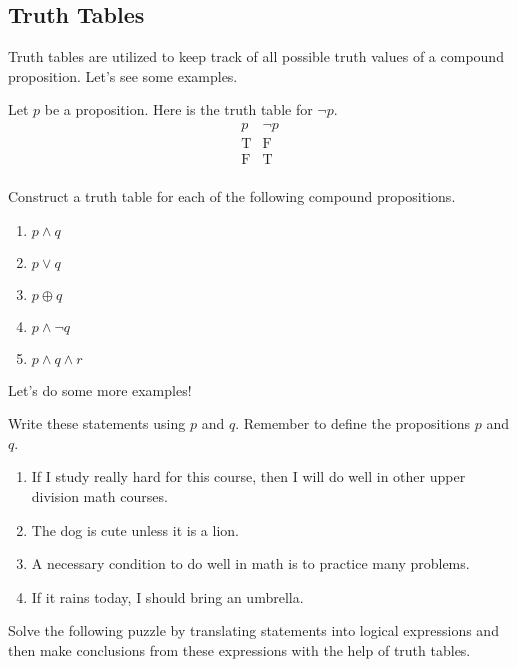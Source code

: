 \documentclass[../notes.tex]{subfiles}
\begin{document}
\subsection{Truth Tables} 
Truth tables are utilized to keep track of all possible truth values of a compound proposition. Let's see some examples.
\begin{example}
    Let $p$ be a proposition. Here is the truth table for $\lnot p$.
    \[\begin{array}{ c|c }
        p & \neg p\\\hline
        \text{T} & \text{F} \\
        \text{F} & \text{T} \\
    \end{array}\]
\end{example}
\begin{exercise}
    Construct a truth table for each of the following compound propositions.
    \begin{enumerate}[label=(\alph*)]
        \item $p \land q$
        \item $p \lor q$
        \item $p \oplus q$
        \item $p \land \neg q$
        \item $p \land q \land r$
    \end{enumerate}
\end{exercise}
Let's do some more examples! 
\begin{exercise}
    Write these statements using $p$ and $q$. Remember to define the propositions $p$ and $q$.
    \begin{enumerate}[label=(\alph*)]
        \item If I study really hard for this course, then I will do well in other upper division math courses. 
        \item The dog is cute unless it is a lion. 
        \item A necessary condition to do well in math is to practice many problems.
        \item If it rains today, I should bring an umbrella. 
    \end{enumerate}
\end{exercise}
Solve the following puzzle by translating statements into logical expressions and then make conclusions from these expressions with the help of truth tables.
\end{document}
